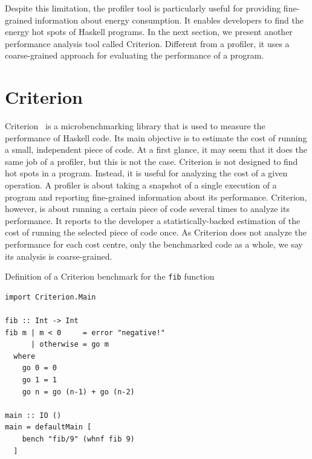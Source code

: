 Despite this limitation, the profiler tool is particularly useful for providing fine-grained information about energy consumption. It enables developers to find the energy hot spots of Haskell programs. In the next section, we present another performance analysis tool called Criterion. Different from a profiler, it uses a coarse-grained approach for evaluating the performance of a program.


\section{Criterion}\label{sec:criterion}
Criterion~\cite{sullivan:2009} is a microbenchmarking library that is used to measure the performance of Haskell code. Its main objective is to estimate the cost of running a small, independent piece of code. At a first glance, it may seem that it does the same job of a profiler, but this is not the case. Criterion is not designed to find hot spots in a program. Instead, it is useful for analyzing the cost of a given operation. A profiler is about taking a snapshot of a single execution of a program and reporting fine-grained information about its performance. Criterion, however, is about running a certain piece of code several times to analyze its performance. It reports to the developer a statistically-backed estimation of the cost of running the selected piece of code once. As Criterion does not analyze the performance for each cost centre, only the benchmarked code as a whole, we say its analysis is coarse-grained.

\begin{listing}
  \caption{Definition of a Criterion benchmark for the \texttt{fib} function}
  \begin{verbatim}
import Criterion.Main

fib :: Int -> Int
fib m | m < 0     = error "negative!"
      | otherwise = go m
  where
    go 0 = 0
    go 1 = 1
    go n = go (n-1) + go (n-2)

main :: IO ()
main = defaultMain [
    bench "fib/9" (whnf fib 9)
  ]
  \end{verbatim}
  \label{code:fib-crit}
\end{listing}

